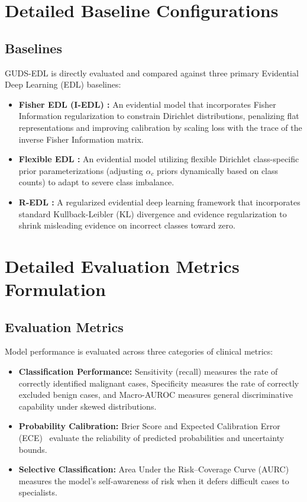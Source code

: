 \documentclass[letterpaper]{article} %
\begin{document}
\section{Detailed Baseline Configurations}
\subsection{Baselines}\label{subsec:baselines}

GUDS-EDL is directly evaluated and compared against three primary Evidential Deep Learning (EDL) baselines:
\begin{itemize}
    \item \textbf{Fisher EDL (I-EDL) \cite{fisher_edl2023}:} An evidential model that incorporates Fisher Information regularization to constrain Dirichlet distributions, penalizing flat representations and improving calibration by scaling loss with the trace of the inverse Fisher Information matrix.
    \item \textbf{Flexible EDL \cite{flexible_edl2023}:} An evidential model utilizing flexible Dirichlet class-specific prior parameterizations (adjusting $\alpha_c$ priors dynamically based on class counts) to adapt to severe class imbalance.
    \item \textbf{R-EDL \cite{sensoy2018evidential}:} A regularized evidential deep learning framework that incorporates standard Kullback-Leibler (KL) divergence and evidence regularization to shrink misleading evidence on incorrect classes toward zero.
\end{itemize}


\section{Detailed Evaluation Metrics Formulation}
\subsection{Evaluation Metrics}\label{subsec:metrics}

Model performance is evaluated across three categories of clinical metrics:
\begin{itemize}
    \item \textbf{Classification Performance:} Sensitivity (recall) measures the rate of correctly identified malignant cases, Specificity measures the rate of correctly excluded benign cases, and Macro-AUROC measures general discriminative capability under skewed distributions.
    \item \textbf{Probability Calibration:} Brier Score and Expected Calibration Error (ECE)~\cite{naeini2015obtaining} evaluate the reliability of predicted probabilities and uncertainty bounds.
    \item \textbf{Selective Classification:} Area Under the Risk--Coverage Curve (AURC)~\cite{geifman2017selective,geifman2019selectivenet,jaeger2023call} measures the model's self-awareness of risk when it defers difficult cases to specialists.
\end{itemize}
\end{document}

